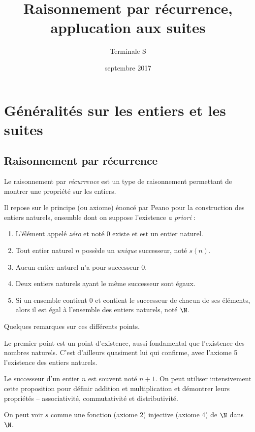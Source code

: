 \documentclass[12pt,a4paper,frenchb]{article}
\title{Raisonnement par récurrence, applucation aux suites}
\author{Terminale S}
\date{septembre 2017}
\makeatletter
\renewcommand{\maketitle}%
{\framebox{%
    \begin{minipage}{1.0\linewidth}%
      \begin{center}%
        \Large \@title ~-- \@author \\%
        \@date%
      \end{center}%
    \end{minipage}}%
  \normalsize%
}
\makeatother
\begin{document}
\maketitle

\section{Généralités sur les entiers et les suites}

\subsection{Raisonnement par récurrence}

Le raisonnement par \emph{récurrence} est un type de raisonnement
permettant de montrer une propriété sur les entiers.

Il repose sur le principe (ou axiome) énoncé par Peano pour la
construction des entiers naturels, ensemble dont on suppose l'existence
\emph{a priori} :
\begin{enumerate}[label=(\roman*),labelsep=7pt]
  \item L'élément appelé \emph{zéro} et noté 0 existe et est un entier
    naturel.
  \item Tout entier naturel $n$ possède un \emph{unique} successeur,
    noté $s(n)$.
  \item Aucun entier naturel n'a pour successeur 0.
  \item Deux entiers naturels ayant le même successeur sont égaux.
  \item Si un ensemble contient 0 et contient le successeur de chacun de
    ses éléments, alors il est égal à l'ensemble des entiers naturels,
    noté $\N$.
\end{enumerate}

Quelques remarques sur ces différents points.

Le premier point est un point d'existence, aussi fondamental que
l'existence des nombres naturels. C'est d'ailleurs quasiment lui qui
confirme, avec l'axiome 5 l'existence des entiers naturels.

Le successeur d'un entier $n$ est souvent noté $n+1$. On peut utiliser
intensivement cette proposition pour définir addition et multiplication
et démontrer leurs propriétés -- associativité, commutativité et
distributivité.

On peut voir $s$ comme une fonction (axiome 2) injective (axiome 4) de
$\N$ dans $\N$.

\end{document}
